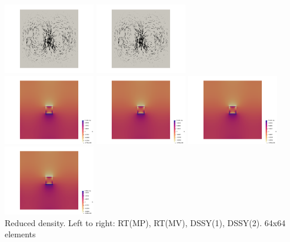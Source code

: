 \begin{center}
\includegraphics[width=4cm]{python_codes/fieldstone_77/results/block/reduced/vels3}
\includegraphics[width=4cm]{python_codes/fieldstone_77/results/block/reduced/vels4}\\
\includegraphics[width=4cm]{python_codes/fieldstone_77/results/block/reduced/press1}
\includegraphics[width=4cm]{python_codes/fieldstone_77/results/block/reduced/press2}
\includegraphics[width=4cm]{python_codes/fieldstone_77/results/block/reduced/press3}
\includegraphics[width=4cm]{python_codes/fieldstone_77/results/block/reduced/press4}\\
{\captionfont Reduced density. Left to right: RT(MP), RT(MV), DSSY(1), DSSY(2). 64x64 elements}
\end{center}


